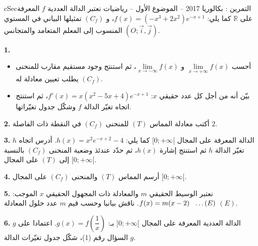 \documentclass[12pt,a4paper]{article}
\newenvironment{BOX}[2]{\begin{otherlanguage}{english}\begin{arbox}{#1}{#2}}{\end{arbox}\end{otherlanguage}}
\newcounter{exo}
\newenvironment{tamrin}[1]{\stepcounter{exo}\begin{BOX}{cSec}{التمرين \theexo: #1}}{\end{BOX}}
\renewcommand{\ldots}{\mathinner{\ldotp\ldotp\ldotp}}
\newcommand{\R}{\mathbb{R}}
\newenvironment{sq}{\begin{itemize}[leftmargin=2.4em,itemsep=3pt]}{\end{itemize}}
\newcommand{\qa}{\item[(أ)]}\newcommand{\qb}{\item[(ب)]}\newcommand{\qc}{\item[(جـ)]}\newcommand{\qd}{\item[(د)]}\newcommand{\qe}{\item[(هـ)]}
\newcommand{\QQ}[1]{\par\smallskip\textbf{#1.} }
\begin{document}
\begin{tamrin}{بكالوريا 2017 -- الموضوع الأول -- رياضيات}
نعتبر الدالة العددية $f$ المعرفة على $\R$ كما يلي: $f(x)=(-x^3+2x^2)e^{-x+1}$،
و $(C_f)$ تمثيلها البياني في المستوي المنسوب إلى المعلم المتعامد والمتجانس $(O;\vec i,\vec j)$.
\QQ{1}
\begin{sq}
\qa أحسب $\lim\limits_{x\to+\infty}f(x)$ و $\lim\limits_{x\to-\infty}f(x)$، ثم استنتج وجود مستقيم مقارب للمنحنى $(C_f)$ يطلب تعيين معادلة له.
\qb بيّن أنه من أجل كل عدد حقيقي $x$: $f'(x)=x(x^2-5x+4)e^{-x+1}$، ثم استنتج اتجاه تغيّر الدالة $f$ وشكّل جدول تغيّراتها.
\end{sq}
\QQ{2} أكتب معادلة المماس $(T)$ للمنحنى $(C_f)$ في النقطة ذات الفاصلة $2$.
\QQ{3} $h$ الدالة المعرفة على المجال $[0;+\infty[$ كما يلي: $h(x)=x^2e^{-x+2}-4$.
أدرس اتجاه تغيّر الدالة $h$ ثم استنتج إشارة $h(x)$، ثم حدّد عندئذ وضعية المنحنى $(C_f)$ بالنسبة إلى $(T)$ على المجال $[0;+\infty[$.
\QQ{4} أرسم المماس $(T)$ والمنحنى $(C_f)$ على المجال $[0;+\infty[$.
\QQ{5} نعتبر الوسيط الحقيقي $m$ والمعادلة ذات المجهول الحقيقي $x$ الموجب: \quad $f(x)=m(x-2)\ \ \ldots(E)$.
ناقش بيانيا وحسب قيم $m$ عدد حلول المعادلة $(E)$.
\QQ{6} $g$ الدالة العددية المعرفة على المجال $]0;+\infty[$ بـ: $g(x)=f\left(\dfrac1x\right)$.
اعتمادا على السؤال رقم (1)، شكّل جدول تغيّرات الدالة $g$.
\end{tamrin}
\end{document}
